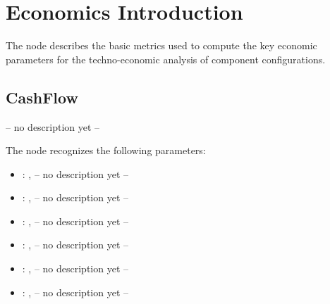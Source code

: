 \section{Economics Introduction}The  node describes the basic metrics used to compute the key economic parameters for the techno-economic analysis of component configurations.




\subsection{CashFlow}
  -- no description yet --

  The  node recognizes the following parameters:
    \begin{itemize}
      \item {}: , 
        -- no description yet --
      \item {}: , 
        -- no description yet --
      \item {}: , 
        -- no description yet --
      \item {}: , 
        -- no description yet --
      \item {}: , 
        -- no description yet --
      \item {}: , 
        -- no description yet --
  \end{itemize}

